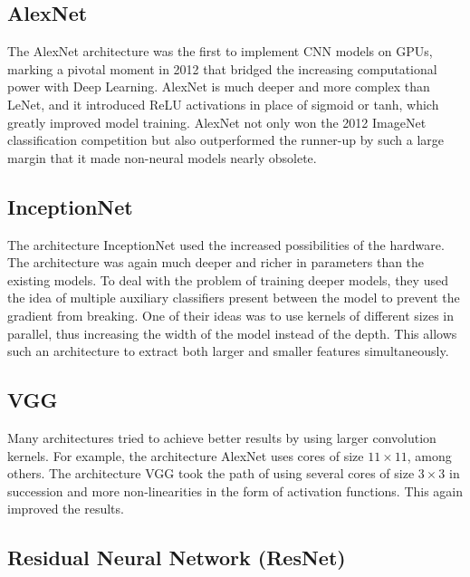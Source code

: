 {\begin{table}
	\end{table}
	
	
	
	
	\subsection*{AlexNet} 
	
	The AlexNet architecture was the first to implement CNN models on GPUs, marking a pivotal moment in 2012 that bridged the increasing computational power with Deep Learning. AlexNet is much deeper and more complex than LeNet, and it introduced ReLU activations in place of sigmoid or tanh, which greatly improved model training. AlexNet not only won the 2012 ImageNet classification competition but also outperformed the runner-up by such a large margin that it made non-neural models nearly obsolete. \cite{Krizhevsky:2012}
	
	
	
	\subsection*{InceptionNet}
	
	
	The architecture InceptionNet used the increased possibilities of the hardware. The architecture was again much deeper and richer in parameters than the existing models. To deal with the problem of training deeper models, they used the idea of multiple auxiliary classifiers present between the model to prevent the gradient from breaking. One of their ideas was to use kernels of different sizes in parallel, thus increasing the width of the model instead of the depth. This allows such an architecture to extract both larger and smaller features simultaneously. \cite{Szegedy:2014}
	
	
	\subsection*{VGG}
	
	Many architectures tried to achieve better results by using larger convolution kernels. For example, the architecture AlexNet uses cores of size $11 \times 11$, among others. The architecture VGG took the path of using several cores of size $3\times 3$ in succession and more non-linearities in the form of activation functions. This again improved the results. \cite{Zhang:2015,Simonyan:2015}
	
	\subsection*{Residual Neural Network (ResNet)}
	
}
